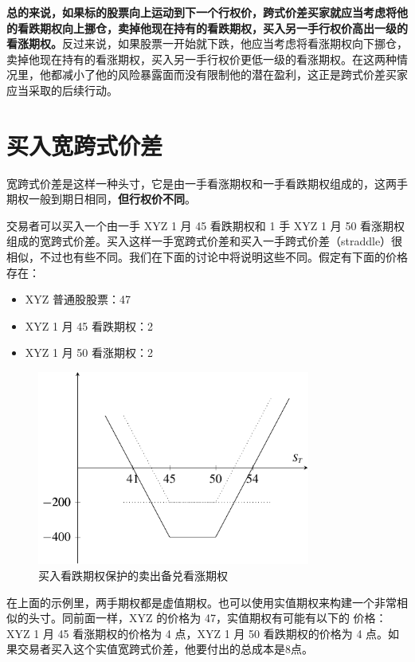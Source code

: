 \textbf{总的来说，如果标的股票向上运动到下一个行权价，跨式价差买家就应当考虑将他的看跌期权向上挪仓，卖掉他现在持有的看跌期权，买入另一手行权价高出一级的看涨期权。}反过来说，如果股票一开始就下跌，他应当考虑将看涨期权向下挪仓，卖掉他现在持有的看涨期权，买入另一手行权价更低一级的看涨期权。在这两种情况里，他都减小了他的风险暴露面而没有限制他的潜在盈利，这正是跨式价差买家应当采取的后续行动。

\section{买入宽跨式价差}
宽跨式价差是这样一种头寸，它是由一手看涨期权和一手看跌期权组成的，这两手期权一般到期日相同，\textbf{但行权价不同}。
\begin{tcolorbox}
    交易者可以买入一个由一手 XYZ 1 月 45 看跌期权和 1 手 XYZ 1 月 50 看涨期权组成的宽跨式价差。买入这样一手宽跨式价差和买入一手跨式价差（straddle）很相似，不过也有些不同。我们在下面的讨论中将说明这些不同。假定有下面的价格存在：
    \begin{itemize}
        \item XYZ 普通股股票：47
        \item XYZ 1 月 45 看跌期权：2
        \item XYZ 1 月 50 看涨期权：2
    \end{itemize}
\end{tcolorbox}

\begin{figure}
    \centering
    \includegraphics[width=0.8\textwidth]{IMG/strangle.pdf}
    \caption{买入看跌期权保护的卖出备兑看涨期权}
    \label{fig:strangle}
\end{figure}

在上面的示例里，两手期权都是虚值期权。也可以使用实值期权来构建一个非常相似的头寸。同前面一样，XYZ 的价格为 47，实值期权有可能有以下的
价格：XYZ 1 月 45 看涨期权的价格为 4 点，XYZ 1 月 50 看跌期权的价格为 4 点。如果交易者买入这个实值宽跨式价差，他要付出的总成本是8点。

